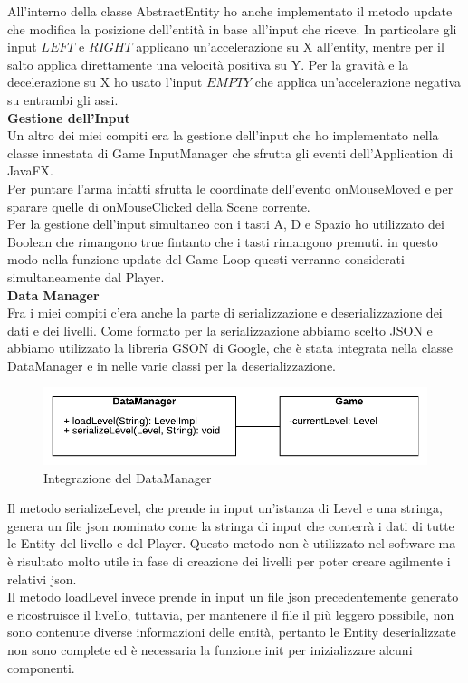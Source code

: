 \documentclass[a4paper,12pt]{report}
\begin{document}
All'interno della classe AbstractEntity ho anche implementato il metodo update che modifica la posizione dell'entità in base all'input che riceve.
In particolare gli input {$LEFT$} e {$RIGHT$} applicano un'accelerazione su X all'entity, mentre per il salto applica direttamente una velocità positiva su Y. Per la gravità e la decelerazione su X ho usato l'input {$EMPTY$} che applica un'accelerazione negativa su entrambi gli assi.\\

\textbf{Gestione dell'Input}\\

Un altro dei miei compiti era la gestione dell'input che ho implementato nella classe innestata di Game InputManager che sfrutta gli eventi dell'Application di JavaFX.\\

Per puntare l'arma infatti sfrutta le coordinate dell'evento onMouseMoved e per sparare quelle di onMouseClicked della Scene corrente.\\
Per la gestione dell'input simultaneo con i tasti A, D e Spazio ho utilizzato dei Boolean che rimangono true fintanto che i tasti rimangono premuti. in questo modo nella funzione update del Game Loop questi verranno considerati simultaneamente dal Player.\\
\textbf{Data Manager}\\

Fra i miei compiti c'era anche la parte di serializzazione e deserializzazione dei dati e dei livelli. Come formato per la serializzazione abbiamo scelto JSON e abbiamo utilizzato la libreria GSON di Google, che è stata integrata nella classe DataManager e in nelle varie classi per la deserializzazione.

\begin{figure}[ht]
\includegraphics[width=1\textwidth]{images/DataManager.png}
\caption{Integrazione del DataManager}
\label{fig:datamanager}
\end{figure}

Il metodo serializeLevel, che prende in input un'istanza di Level e una stringa, genera un file json nominato come la stringa di input che conterrà i dati di tutte le Entity del livello e del Player. Questo metodo non è utilizzato nel software ma è risultato molto utile in fase di creazione dei livelli per poter creare agilmente i relativi json.\\
Il metodo loadLevel invece prende in input un file json precedentemente generato e ricostruisce il livello, tuttavia, per mantenere il file il più leggero possibile, non sono contenute diverse informazioni delle entità, pertanto le Entity deserializzate non sono complete ed è necessaria la funzione init per inizializzare alcuni componenti.
\end{document}
